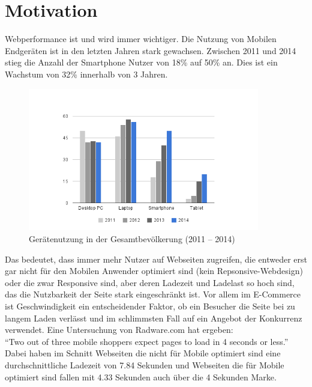 \documentclass[a4paper,11pt,singlespacing]{article}
\begin{document}
\section{Motivation} %
\label{sec:motivation}
	Webperformance ist und wird immer wichtiger.
	Die Nutzung von Mobilen Endgeräten ist in den letzten Jahren stark gewachsen. Zwischen 2011 und 2014 stieg die Anzahl der Smartphone Nutzer von 18\% auf 50\% an. Dies ist ein Wachstum von 32\% innerhalb von 3 Jahren.\autocite{tns14}
	\begin{figure}[htbp]
		\begin{center}
			\includegraphics[width=0.9\textwidth]{smartphoneUsage.png}
		\end{center}
		\caption{Gerätenutzung in der Gesamtbevölkerung (2011 – 2014)\autocite{tns14}}
		\label{fig:geraetenutzung}
	\end{figure}
	Das bedeutet, dass immer mehr Nutzer auf Webseiten zugreifen, die entweder erst gar nicht für den Mobilen Anwender optimiert sind (kein Repsonsive-Webdesign) oder die zwar Responsive sind, aber deren Ladezeit und Ladelast so hoch sind, das die Nutzbarkeit der Seite stark eingeschränkt ist. Vor allem im E-Commerce ist Geschwindigkeit ein entscheidender Faktor, ob ein Besucher die Seite bei zu langem Laden verlässt und im schlimmsten Fall auf ein Angebot der Konkurrenz verwendet. Eine Untersuchung von Radware.com hat ergeben:\\

	"`Two out of three mobile shoppers expect pages to load in 4 seconds or less."'\autocite{radware13}\\

	Dabei haben im Schnitt Webseiten die nicht für Mobile optimiert sind eine durchschnittliche Ladezeit von 7.84 Sekunden und Webseiten die für Mobile optimiert sind fallen mit 4.33 Sekunden auch über die 4 Sekunden Marke.\autocite{radware13} 
\end{document}

